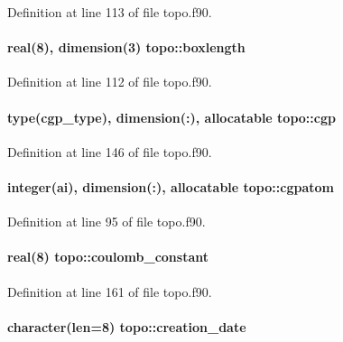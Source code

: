 Definition at line 113 of file topo.\-f90.

\hypertarget{classtopo_a17297954a20e0e493e7c6415823fc312}{
\paragraph[{boxlength}]{\setlength{\rightskip}{0pt plus 5cm}real(8), dimension(3) topo\-::boxlength}}\label{classtopo_a17297954a20e0e493e7c6415823fc312}


Definition at line 112 of file topo.\-f90.

\hypertarget{classtopo_a14c15995f0c51e3f476a707dacdb8325}{
\paragraph[{cgp}]{\setlength{\rightskip}{0pt plus 5cm}type({\bf cgp\-\_\-type}), dimension(\-:), allocatable topo\-::cgp}}\label{classtopo_a14c15995f0c51e3f476a707dacdb8325}


Definition at line 146 of file topo.\-f90.

\hypertarget{classtopo_aaa0378f603bebaa45a7aaa20adf7a881}{
\paragraph[{cgpatom}]{\setlength{\rightskip}{0pt plus 5cm}integer(ai), dimension(\-:), allocatable topo\-::cgpatom}}\label{classtopo_aaa0378f603bebaa45a7aaa20adf7a881}


Definition at line 95 of file topo.\-f90.

\hypertarget{classtopo_a5d5c22c48d2fd1140ed5943ce44f0192}{
\paragraph[{coulomb\-\_\-constant}]{\setlength{\rightskip}{0pt plus 5cm}real(8) topo\-::coulomb\-\_\-constant}}\label{classtopo_a5d5c22c48d2fd1140ed5943ce44f0192}


Definition at line 161 of file topo.\-f90.

\hypertarget{classtopo_a89837e9df3b93b954210d3f9b7f6ed4b}{
\paragraph[{creation\-\_\-date}]{\setlength{\rightskip}{0pt plus 5cm}character(len=8) topo\-::creation\-\_\-date}}\label{classtopo_a89837e9df3b93b954210d3f9b7f6ed4b}



